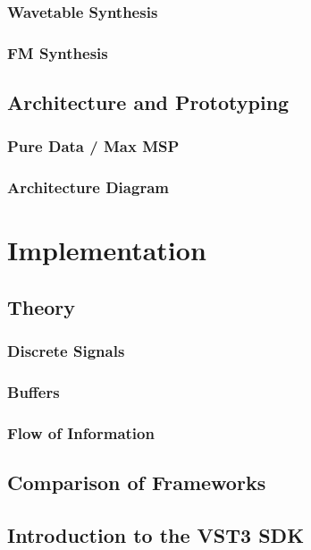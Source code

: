 \documentclass[12pt]{article}
\begin{document}
\subsubsection{Wavetable Synthesis}

\subsubsection{FM Synthesis}

\subsection{Architecture and Prototyping}

\subsubsection{Pure Data / Max MSP}

\subsubsection{Architecture Diagram}

\section{Implementation}

\subsection{Theory}

\subsubsection{Discrete Signals}

\subsubsection{Buffers}

\subsubsection{Flow of Information}

\subsection{Comparison of Frameworks}

\subsection{Introduction to the VST3 SDK}
\end{document}
